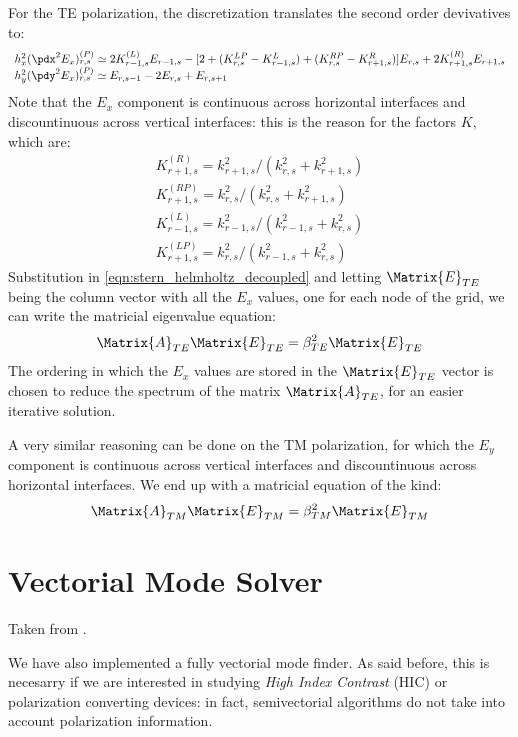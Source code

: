 For the TE polarization, the discretization translates the second
order devivatives to:
$$
\begin{array}{l}
h_x^2 (\pdx^2 E_x)^{(P)}_{r,s} \simeq 2 K^{(L)}_{r-1,s} E_{r-1,s} - [2 +
  (K^{LP}_{r,s} - K^{L}_{r-1,s}) + (K^{RP}_{r,s} - K^{R}_{r+1,s})]
E_{r,s} + 2 K^{(R)}_{r+1,s} E_{r+1,s} \\
h_y^2 (\pdy^2 E_x)^{(P)}_{r,s} \simeq E_{r,s-1} - 2 E_{r,s} + E_{r,s+1}
\end{array}
$$
Note that the $E_x$ component is continuous across horizontal
interfaces and discountinuous across vertical interfaces: this is the
reason for the factors $K$, which are:
$$
\begin{array}{l}
K^{(R)}_{r+1,s}  = k^2_{r+1,s} / (k^2_{r,s} + k^2_{r+1,s}) \\
K^{(RP)}_{r+1,s} = k^2_{r,s}   / (k^2_{r,s} + k^2_{r+1,s}) \\
K^{(L)}_{r-1,s}  = k^2_{r-1,s} / (k^2_{r-1,s} + k^2_{r,s}) \\
K^{(LP)}_{r+1,s} = k^2_{r,s}   / (k^2_{r-1,s} + k^2_{r,s})
\end{array}
$$
Substitution in \ref{eqn:stern_helmholtz_decoupled} and letting
$\Matrix{E}_{TE}$ being the column vector with all the $E_x$ values, one
for each node of the grid, we can write the matricial eigenvalue
equation:
$$
\Matrix{A}_{TE} \Matrix{E}_{TE} = \beta^2_{TE} \Matrix{E}_{TE}
$$
The ordering in which the $E_x$ values are stored in the
$\Matrix{E}_{TE}$ vector is chosen to reduce the spectrum of the
matrix $\Matrix{A}_{TE}$, for an easier iterative solution.

A very similar reasoning can be done on the TM polarization, for which
the $E_y$ component is continuous across vertical interfaces and
discountinuous across horizontal interfaces. We end up with a
matricial equation of the kind:
$$
\Matrix{A}_{TM} \Matrix{E}_{TM} = \beta^2_{TM} \Matrix{E}_{TM}
$$

\section{Vectorial Mode Solver}

Taken from \cite{lusse_analysis}.

We have also implemented a fully vectorial mode finder. As said
before, this is necesarry if we are interested in studying \emph{High
  Index Contrast} (HIC) or polarization converting devices: in fact,
semivectorial algorithms do not take into account polarization
information.

